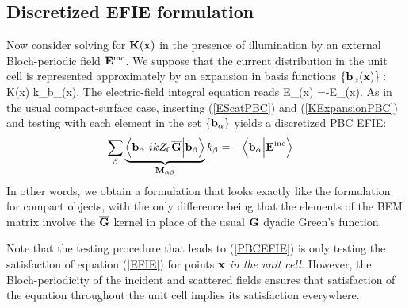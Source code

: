 \subsection{Discretized EFIE formulation}

Now consider solving for $\mathbf{K}(\mathbf{x})$ in the presence
of illumination by an external Bloch-periodic 
field $\mathbf{E}^{\hbox{\scriptsize{inc}}}$.
We suppose that the current distribution in the unit cell 
is represented approximately by an expansion in basis
functions $\{\mathbf{b}_\alpha(\mathbf{x})\}:$
{\vb K(\vb x) \approx k_\alpha \vb b_\alpha(\vb x).}
The electric-field integral equation reads
{\vb E_\parallel(\vb x)
   =-\vb E_\parallel(\vb x).
}
As in the usual compact-surface case, inserting (\ref{EScatPBC}) 
and (\ref{KExpansionPBC}) and testing with each element in the set 
$\{\mathbf{b}_\alpha\}$ yields a discretized PBC EFIE:
\begin{align}
 \sum_{\beta}
 \underbrace{
   \Big \langle \mathbf{b}_\alpha \Big|
   ikZ_0\overline{\mathbf{G}}    
   \Big| \mathbf{b}_\beta \Big\rangle
            }_{\mathbf{M}_{\alpha\beta}} 
   k_\beta
&=-\Big \langle \mathbf{b}_\alpha \Big | \mathbf{E}^{\hbox{\scriptsize{inc}}} \Big\rangle
\label{PBCEFIE}
\end{align}
In other words, we obtain a formulation that looks exactly
like the formulation for compact objects, with the only
difference being that the elements of the BEM matrix
involve the $\overline{\mathbf{G}}$ kernel in place of the usual 
$\mathbf{G}$ dyadic Green's function.

Note that the testing procedure that leads to 
(\ref{PBCEFIE}) is only testing the satisfaction
of equation (\ref{EFIE}) for points $\mathbf{x}$
\textit{in the unit cell.} However, the Bloch-periodicity
of the incident and scattered fields ensures that
satisfaction of the equation throughout the unit cell
implies its satisfaction everywhere.

